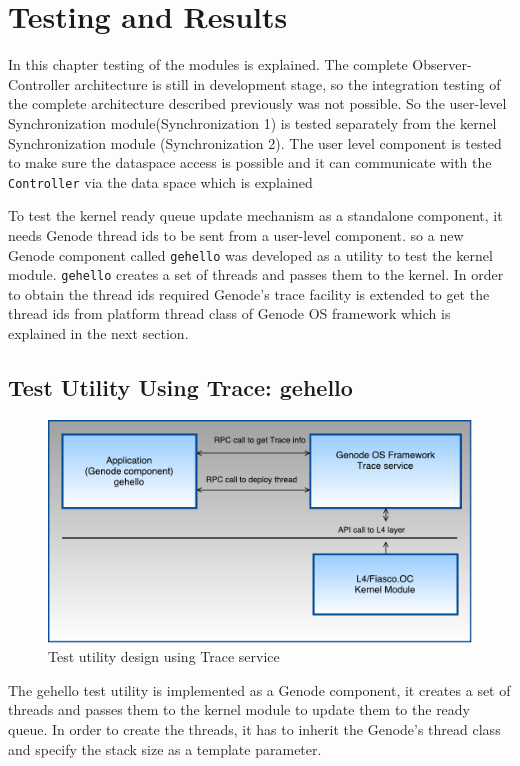 \chapter{Testing and Results}\label{chap:testing}
In this chapter testing of the modules is explained. The complete Observer-Controller architecture is still in development stage, so the integration testing of the complete architecture described previously was not possible. So the user-level Synchronization module(Synchronization 1) is tested separately from the kernel Synchronization module (Synchronization 2). The user level component is tested to make sure the dataspace  access is possible and it can communicate with the \texttt{Controller} via the data space which is explained 

To test the kernel ready queue update mechanism as a standalone component, it needs Genode thread ids to be sent from a user-level component. so a new Genode component called \texttt{gehello} was developed as a utility to test the kernel module. \texttt{gehello}
creates a set of threads and passes them to the kernel. In order to obtain the thread ids required Genode's trace facility is extended to get the thread ids from platform thread class of Genode OS framework which is explained in the next section.

\section{Test Utility Using Trace: gehello}

\begin{figure}[h]
\centering
\includegraphics[width=0.7\linewidth]{figures/test1}
\caption{Test utility design using Trace service}
\label{fig:test}
\end{figure}

The gehello test utility is implemented as a Genode component, it creates a set of threads and passes them to the kernel module to update them to the ready queue. In order to create the threads, it has to inherit the Genode's thread class and specify the stack size as a template parameter. 

